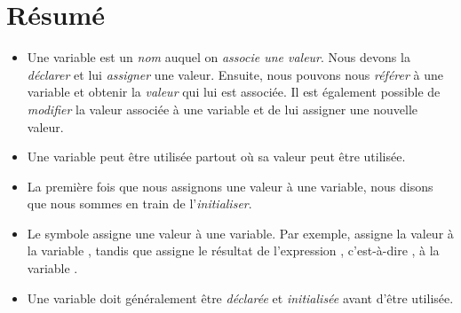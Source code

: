 \documentclass[a4paper,10pt,twoside]{book}
\begin{document}
\section{R\'esum\'e} 

\begin{itemize}
	\item Une variable est un \emph{nom} auquel on \emph{associe une valeur}. Nous devons la \emph{d\'eclarer} et lui \emph{assigner} une valeur. Ensuite, nous pouvons nous \emph{r\'ef\'erer} \`a une variable et obtenir la \emph{valeur} qui lui est associ\'ee. Il est \'egalement possible de \emph{modifier} la valeur associ\'ee \`a une variable et de lui assigner une nouvelle valeur. 

\item Une variable peut \^etre utilis\'ee partout o\`u sa valeur peut \^etre utilis\'ee.
 
\item La premi\`ere fois que nous assignons une valeur \`a une variable, nous disons que nous sommes en train de l'\emph{initialiser}.

\item Le symbole \ct{:=} assigne une valeur \`a une variable. Par exemple,  assigne la valeur  \`a la variable , tandis que  assigne le r\'esultat de l'expression , c'est-\`a-dire , \`a la variable .

\item Une variable doit g\'en\'eralement \^etre \emph{d\'eclar\'ee} et \emph{initialis\'ee} avant d'\^etre utilis\'ee. 
\end{itemize}








\ifx\wholebook\relax\else
    
\end{document}

